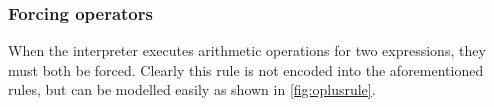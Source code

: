 \documentclass[11pt,oneside,a4paper]{report}
\begin{document}
\subsubsection{Forcing operators}
When the interpreter executes arithmetic operations for two expressions, they must both be forced.
Clearly this rule is not encoded into the aforementioned rules, but can be modelled easily as shown in \autoref{fig:oplusrule}.
\begin{figure}[ht]
  \begin{mdframed}[style=style1]
    \begin{prooftree}
    \end{prooftree}   
  \end{mdframed}
  \caption{}
  \label{fig:oplusrule}
\end{figure}
\end{document}
